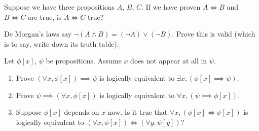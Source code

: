 \begin{xca}
Suppose we have three propositions $A$, $B$, $C$. If we have proven
$A\iff B$ and $B\iff C$ are true, is $A\iff C$ true?
\end{xca}

\begin{xca}
De Morgan's laws say $\neg(A\land B)=(\neg A)\lor(\neg B)$. Prove this
is valid (which is to say, write down its truth table).
\end{xca}

\begin{xca}
Let $\phi[x]$, $\psi$ be propositions. Assume $x$ does not appear at all
in $\psi$.
\begin{enumerate}
\item Prove $(\forall x,\phi[x])\implies\psi$ is logically
equivalent to $\exists x,(\phi[x]\implies\psi)$.
\item Prove $\psi\implies(\forall x,\phi[x])$ is logically equivalent to
  $\forall x,(\psi\implies\phi[x])$.
\item Suppose $\phi[x]$ depends on $x$ now. Is it true that $\forall x,(\phi[x]\iff\psi[x])$
  is logically equivalent to $(\forall x,\phi[x])\iff(\forall y,\psi[y])$?
\end{enumerate}
\end{xca}




